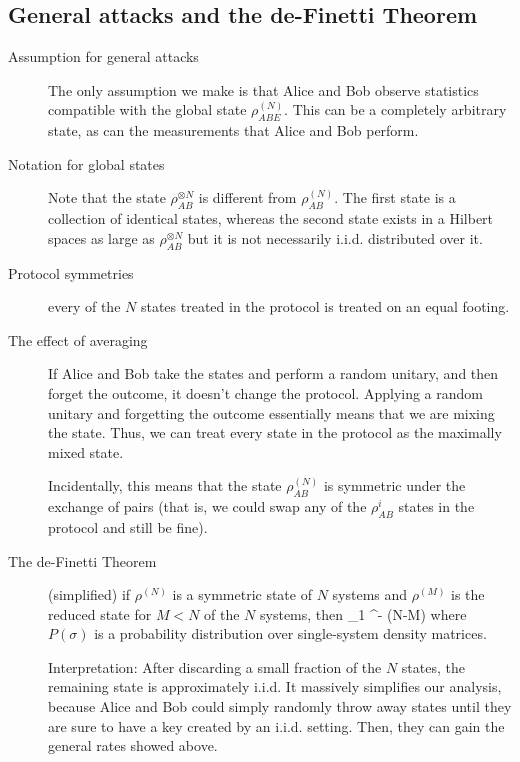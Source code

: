 \subsection{General attacks and the de-Finetti Theorem}
\begin{description}
\item[Assumption for general attacks] The only assumption we make is that Alice and Bob observe statistics compatible with the global state $\rho^{(N)}_{ABE}$. This can be a completely arbitrary state, as can the measurements that Alice and Bob perform. 

\item[Notation for global states] Note that the state $\rho_{AB}^{\otimes N}$ is different from $\rho_{AB}^{(N)}$. The first state is a collection of identical states, whereas the second state exists in a Hilbert spaces as large as $\rho^{\otimes N}_{AB}$ but it is not necessarily i.i.d. distributed over it. 

\item[Protocol symmetries] every of the $N$ states treated in the protocol is treated on an equal footing. 

\item[The effect of averaging] If Alice and Bob take the states and perform a random unitary, and then forget the outcome, it doesn't change the protocol. Applying a random unitary and forgetting the outcome essentially means that we are mixing the state. Thus, we can treat every state in the protocol as the maximally mixed state. 

Incidentally, this means that the state $\rho^{(N)}_{AB}$ is symmetric under the exchange of pairs (that is, we could swap any of the $\rho_{AB}^i$ states in the protocol and still be fine). 

\item[The de-Finetti Theorem] (simplified) if $\rho^{(N)}$ is a symmetric state of $N$ systems and $\rho^{(M)}$ is the reduced state for $M<N$ of the $N$ systems, then 
\beq
{}_1 ^{- (N-M)}
\eeq
where $P(\sigma)$ is a probability distribution over single-system density matrices. 

Interpretation: After discarding a small fraction of the $N$ states, the remaining state is approximately i.i.d. It massively simplifies our analysis, because Alice and Bob could simply randomly throw away states until they are sure to have a key created by an i.i.d. setting. Then, they can gain the general rates showed above. 

\end{description}
